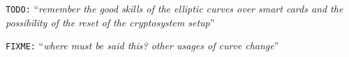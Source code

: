 \documentclass[10pt,a4paper,twoside]{llncs}
\newcommand{\todo}[1]{\texttt{\color{red}TODO:} ``\emph{#1}''}
\newcommand{\fixme}[1]{\texttt{\color{red}FIXME:} ``\emph{#1}''}
\begin{document}
\todo{remember the good skills of the elliptic curves over smart cards and the possibility of the reset of the cryptosystem setup}


\fixme{where must be said this? other usages of curve change}





\end{document}
